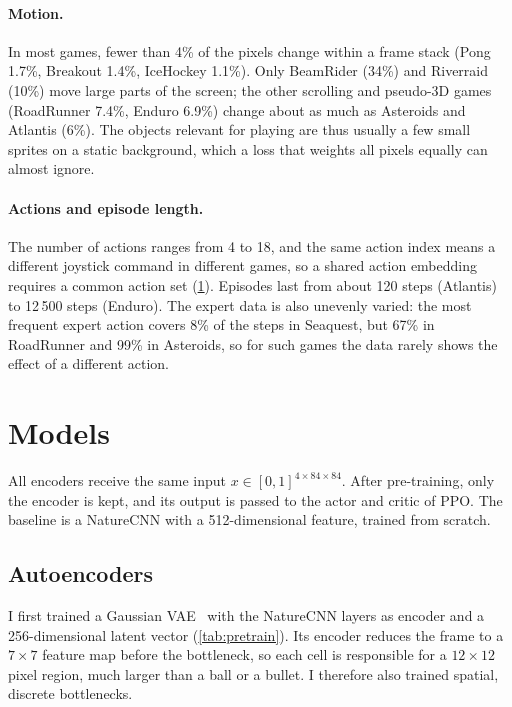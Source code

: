 \documentclass[runningheads]{llncs}
\begin{document}
\paragraph{Motion.} In most games, fewer than 4\% of the pixels change within a frame stack
(Pong 1.7\%, Breakout 1.4\%, IceHockey 1.1\%). Only BeamRider (34\%) and Riverraid (10\%) move
large parts of the screen; the other scrolling and pseudo-3D games (RoadRunner 7.4\%, Enduro
6.9\%) change about as much as Asteroids and Atlantis (6\%). The objects relevant for playing are thus usually a few small sprites on a static background,
which a loss that weights all pixels equally can almost ignore.

\paragraph{Actions and episode length.} The number of actions ranges from 4 to 18, and the same
action index means a different joystick command in different games, so a shared action
embedding requires a common action set (\cref{sec:models}). Episodes last from about
120 steps (Atlantis) to 12\,500 steps (Enduro). The expert data is also unevenly varied: the most frequent expert action covers 8\% of the
steps in Seaquest, but 67\% in RoadRunner and 99\% in Asteroids, so for such games the data
rarely shows the effect of a different action.

\section{Models}
\label{sec:models}

All encoders receive the same input $x\in[0,1]^{4\times84\times84}$. After pre-training, only the encoder is kept, and its output is passed to the actor and critic
of PPO. The baseline is a NatureCNN with a 512-dimensional feature, trained
from scratch.

\FloatBarrier
\subsection{Autoencoders}

I first trained a Gaussian VAE~\cite{kingma2014vae} with the NatureCNN layers as encoder and
a 256-dimensional latent vector (\cref{tab:pretrain}). Its encoder reduces the frame to a
$7\times7$ feature map before the bottleneck, so each cell is responsible for a $12\times12$
pixel region, much larger than a ball or a bullet. I therefore also trained spatial, discrete
bottlenecks.
\end{document}
